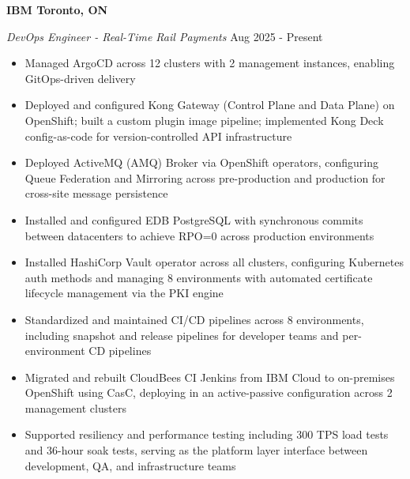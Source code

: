 \textbf{IBM \hfill Toronto, ON}\par
\textit{DevOps Engineer - Real-Time Rail Payments} \hfill Aug 2025 - Present
\begin{itemize}
  \item Managed ArgoCD across 12 clusters with 2 management instances, enabling GitOps-driven delivery
  \item Deployed and configured Kong Gateway (Control Plane and Data Plane) on OpenShift; built a custom plugin image pipeline; implemented Kong Deck config-as-code for version-controlled API infrastructure
  \item Deployed ActiveMQ (AMQ) Broker via OpenShift operators, configuring Queue Federation and Mirroring across pre-production and production for cross-site message persistence
  \item Installed and configured EDB PostgreSQL with synchronous commits between datacenters to achieve RPO=0 across production environments
  \item Installed HashiCorp Vault operator across all clusters, configuring Kubernetes auth methods and managing 8 environments with automated certificate lifecycle management via the PKI engine
  \item Standardized and maintained CI/CD pipelines across 8 environments, including snapshot and release pipelines for developer teams and per-environment CD pipelines
  \item Migrated and rebuilt CloudBees CI Jenkins from IBM Cloud to on-premises OpenShift using CasC, deploying in an active-passive configuration across 2 management clusters
  \item Supported resiliency and performance testing including 300 TPS load tests and 36-hour soak tests, serving as the platform layer interface between development, QA, and infrastructure teams
\end{itemize}
\vspace{0.1cm}

